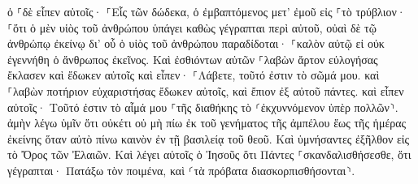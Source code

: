 \documentclass{openreader}
\begin{document}
ὁ ⸀δὲ εἶπεν αὐτοῖς· ⸀Εἷς τῶν δώδεκα, ὁ ἐμβαπτόμενος μετ’ ἐμοῦ εἰς ⸀τὸ τρύβλιον· 
⸀ὅτι ὁ μὲν υἱὸς τοῦ ἀνθρώπου ὑπάγει καθὼς γέγραπται περὶ αὐτοῦ, οὐαὶ δὲ τῷ ἀνθρώπῳ ἐκείνῳ δι’ οὗ ὁ υἱὸς τοῦ ἀνθρώπου παραδίδοται· ⸀καλὸν αὐτῷ εἰ οὐκ ἐγεννήθη ὁ ἄνθρωπος ἐκεῖνος. 
Καὶ ἐσθιόντων αὐτῶν ⸀λαβὼν ἄρτον εὐλογήσας ἔκλασεν καὶ ἔδωκεν αὐτοῖς καὶ εἶπεν· ⸀Λάβετε, τοῦτό ἐστιν τὸ σῶμά μου. 
καὶ ⸀λαβὼν ποτήριον εὐχαριστήσας ἔδωκεν αὐτοῖς, καὶ ἔπιον ἐξ αὐτοῦ πάντες. 
καὶ εἶπεν αὐτοῖς· Τοῦτό ἐστιν τὸ αἷμά μου ⸀τῆς διαθήκης τὸ ⸂ἐκχυννόμενον ὑπὲρ πολλῶν⸃. 
ἀμὴν λέγω ὑμῖν ὅτι οὐκέτι οὐ μὴ πίω ἐκ τοῦ γενήματος τῆς ἀμπέλου ἕως τῆς ἡμέρας ἐκείνης ὅταν αὐτὸ πίνω καινὸν ἐν τῇ βασιλείᾳ τοῦ θεοῦ. 
Καὶ ὑμνήσαντες ἐξῆλθον εἰς τὸ Ὄρος τῶν Ἐλαιῶν. 
Καὶ λέγει αὐτοῖς ὁ Ἰησοῦς ὅτι Πάντες ⸀σκανδαλισθήσεσθε, ὅτι γέγραπται· Πατάξω τὸν ποιμένα, καὶ ⸂τὰ πρόβατα διασκορπισθήσονται⸃. 
\end{document}
